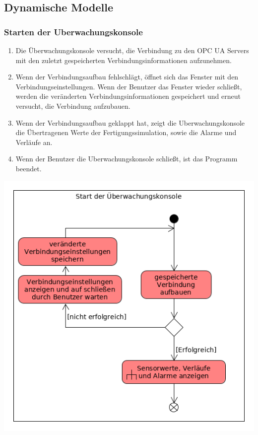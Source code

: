 \documentclass[parskip=full]{scrartcl}
\begin{document}
\subsection{Dynamische Modelle}
\subsubsection{Starten der \gls{Uberwachungskonsole}}
\label{console-launch}
\begin{enumerate}[noitemsep]
 \item Die Überwachungskonsole versucht, die Verbindung zu den \glspl{OPC UA Server} mit den zuletzt gespeicherten Verbindungsinformationen aufzunehmen.
 \item Wenn der Verbindungsaufbau fehlschlägt, öffnet sich das Fenster mit den Verbindungseinstellungen. Wenn der Benutzer das Fenster wieder schließt,
 werden die veränderten Verbindungsinformationen gespeichert und erneut versucht, die Verbindung aufzubauen.
 \item Wenn der Verbindungsaufbau geklappt hat, zeigt die \gls{Uberwachungskonsole} die Übertragenen Werte der \gls{Fertigungssimulation}, sowie die
 Alarme und Verläufe an.
 \item Wenn der Benutzer die \gls{Uberwachungskonsole} schließt, ist das Programm beendet.
\end{enumerate}
\begin{center}
  \includegraphics[scale=0.62]{media/Activities/launch-console.png}
\end{center}
\end{document}
